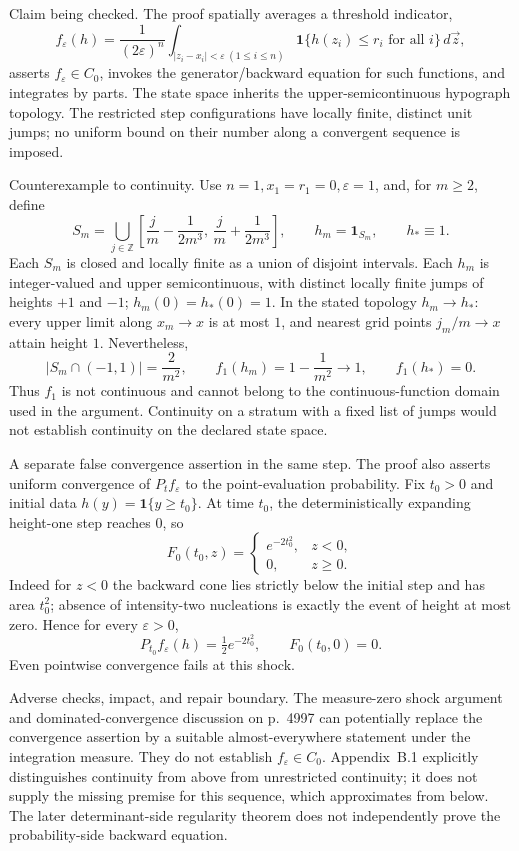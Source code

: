 \documentclass[10pt]{article}
\begin{document}
Claim being checked. The proof spatially averages a threshold indicator, \[f_\varepsilon(h)=\frac{1}{(2\varepsilon)^n}
\int_{|z_i-x_i|<\varepsilon\ (1\leq i\leq n)}
\mathbf 1\{h(z_i)\leq r_i\text{ for all }i\}\,d\vec z,\] asserts \(f_\varepsilon\in C_0\), invokes the generator/backward equation for such functions, and integrates by parts. The state space inherits the upper-semicontinuous hypograph topology. The restricted step configurations have locally finite, distinct unit jumps; no uniform bound on their number along a convergent sequence is imposed.\par
Counterexample to continuity. Use \(n=1,x_1=r_1=0,\varepsilon=1\), and, for \(m\geq2\), define \[S_m=\bigcup_{j\in\mathbb Z}
\left[\frac{j}{m}-\frac{1}{2m^3},\,
      \frac{j}{m}+\frac{1}{2m^3}\right],
\qquad h_m=\mathbf 1_{S_m},\qquad h_* \equiv1 .\] Each \(S_m\) is closed and locally finite as a union of disjoint intervals. Each \(h_m\) is integer-valued and upper semicontinuous, with distinct locally finite jumps of heights \(+1\) and \(-1\); \(h_m(0)=h_*(0)=1\). In the stated topology \(h_m\to h_*\): every upper limit along \(x_m\to x\) is at most \(1\), and nearest grid points \(j_m/m\to x\) attain height \(1\). Nevertheless, \[|S_m\cap(-1,1)|=\frac{2}{m^2},
\qquad f_1(h_m)=1-\frac1{m^2}\longrightarrow1,
\qquad f_1(h_*)=0.\] Thus \(f_1\) is not continuous and cannot belong to the continuous-function domain used in the argument. Continuity on a stratum with a fixed list of jumps would not establish continuity on the declared state space.\par
A separate false convergence assertion in the same step. The proof also asserts uniform convergence of \(P_t f_\varepsilon\) to the point-evaluation probability. Fix \(t_0>0\) and initial data \(h(y)=\mathbf 1\{y\geq t_0\}\). At time \(t_0\), the deterministically expanding height-one step reaches \(0\), so \[F_0(t_0,z)=
\begin{cases}e^{-2t_0^2},&z<0,\\0,&z\geq0.\end{cases}\] Indeed for \(z<0\) the backward cone lies strictly below the initial step and has area \(t_0^2\); absence of intensity-two nucleations is exactly the event of height at most zero. Hence for every \(\varepsilon>0\), \[P_{t_0}f_\varepsilon(h)=\tfrac12e^{-2t_0^2},
\qquad F_0(t_0,0)=0.\] Even pointwise convergence fails at this shock.\par
Adverse checks, impact, and repair boundary. The measure-zero shock argument and dominated-convergence discussion on p. 4997 can potentially replace the convergence assertion by a suitable almost-everywhere statement under the integration measure. They do not establish \(f_\varepsilon\in C_0\). Appendix B.1 explicitly distinguishes continuity from above from unrestricted continuity; it does not supply the missing premise for this sequence, which approximates from below. The later determinant-side regularity theorem does not independently prove the probability-side backward equation.\par
\end{document}
